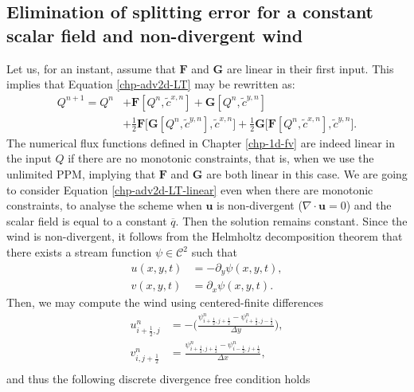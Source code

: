 \subsection{Elimination of splitting error for a constant scalar field and non-divergent wind}
\label{sp-error}
Let us, for an instant, assume that $\mathbf{F}$ and $\mathbf{G}$ are linear in their first input. This implies that Equation \eqref{chp-adv2d-LT} may be rewritten as:
\begin{align}
\label{chp-adv2d-LT-linear}
    Q^{n+1} = Q^n 
    &+ \mathbf{F}[Q^n,\tilde{c}^{x,n}] + \mathbf{G}[Q^n,\tilde{c}^{y,n}] \nonumber \\
    &+\frac{1}{2}\mathbf{F}\bigg[\mathbf{G}[Q^n, \tilde{c}^{y,n}], \tilde{c}^{x,n}\bigg]+
      \frac{1}{2}\mathbf{G}\bigg[\mathbf{F}[Q^n, \tilde{c}^{x,n}], \tilde{c}^{y,n}\bigg].
\end{align}
The numerical flux functions defined in Chapter \ref{chp-1d-fv} are indeed linear in the input $Q$ if there are no monotonic constraints,
that is, when we use the unlimited PPM,
implying that $\mathbf{F}$ and $\mathbf{G}$ are both linear in this case.
We are going to consider Equation \eqref{chp-adv2d-LT-linear}
even when there are monotonic constraints, to analyse the scheme when $\boldsymbol{u}$ is non-divergent ($\nabla \cdot 
\boldsymbol{u} = 0$) and the
scalar field is equal to a constant $\overline{q}$.
Then the solution remains constant. 
Since the wind is non-divergent, it follows from the Helmholtz decomposition theorem 
that there exists a stream function $\psi \in \mathcal{C}^2$ such that
\begin{align*}
    u(x,y,t) &= -\partial_y \psi(x,y,t),\\
    v(x,y,t) &= \partial_x \psi(x,y,t).
\end{align*}
Then, we may compute the wind using centered-finite differences 
\begin{align*}
    u_{i+\frac{1}{2},j}^{n}&=
    -\bigg(\frac{\psi_{i+\frac{1}{2},j+\frac{1}{2}}^{n}-\psi_{i+\frac{1}{2},j-\frac{1}{2}}^{n}}{\Delta y}\bigg),\\
    v_{i,j+\frac{1}{2}}^{n} &= 
    \frac{\psi_{i+\frac{1}{2},j+\frac{1}{2}}^{n}-\psi_{i-\frac{1}{2},j+\frac{1}{2}}^{n}}{\Delta x},\\
\end{align*}
and thus the following discrete divergence free condition holds
